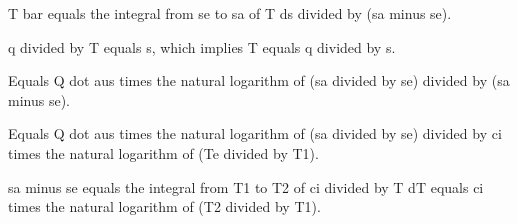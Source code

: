 T bar equals the integral from se to sa of T ds divided by (sa minus se).

q divided by T equals s, which implies T equals q divided by s.

Equals Q dot aus times the natural logarithm of (sa divided by se) divided by (sa minus se).

Equals Q dot aus times the natural logarithm of (sa divided by se) divided by ci times the natural logarithm of (Te divided by T1).

sa minus se equals the integral from T1 to T2 of ci divided by T dT equals ci times the natural logarithm of (T2 divided by T1).